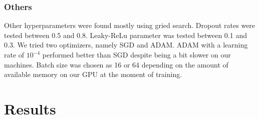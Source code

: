 \documentclass[10pt,conference,compsocconf]{IEEEtran}
\begin{document}
\subsubsection{Others}
Other hyperparameters were found mostly using gried search. Dropout rates were tested between 0.5 and 0.8. Leaky-ReLu parameter was tested between 0.1 and 0.3. We tried two optimizers, namely SGD and ADAM. ADAM with a learning rate of $10^{-4}$ performed better than SGD despite being a bit slower on our machines. Batch size was chosen as 16 or 64 depending on the amount of available memory on our GPU at the moment of training.
\vspace{-0.1in}
\section{Results}
\vspace{-0.1in}
\end{document}
